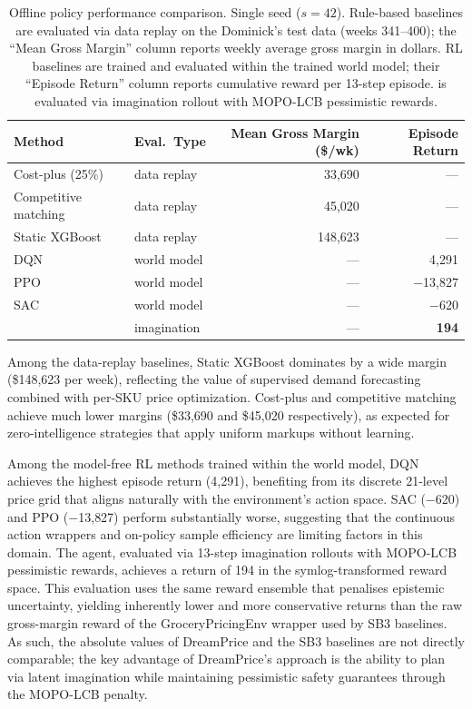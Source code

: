 \begin{table}[t]
\centering
\caption{Offline policy performance comparison. Single seed ($s=42$). Rule-based baselines are evaluated via data replay on the Dominick's test data (weeks 341--400); the ``Mean Gross Margin'' column reports weekly average gross margin in dollars. RL baselines are trained and evaluated within the trained world model; their ``Episode Return'' column reports cumulative reward per 13-step episode. \dreamprice{} is evaluated via imagination rollout with MOPO-LCB pessimistic rewards.\vspace{2pt}}
\label{tab:baseline-comparison}
\small
\begin{tabular}{@{}llrr@{}}
\toprule
\textbf{Method} & \textbf{Eval.\ Type} & \textbf{Mean Gross Margin (\$/wk)} & \textbf{Episode Return} \\
\midrule
Cost-plus (25\%) & data replay & 33{,}690 & --- \\
Competitive matching & data replay & 45{,}020 & --- \\
Static XGBoost & data replay & 148{,}623 & --- \\
\midrule
DQN & world model & --- & 4{,}291 \\
PPO & world model & --- & $-$13{,}827 \\
SAC & world model & --- & $-$620 \\
\midrule
\dreamprice{} & imagination & --- & \textbf{194} \\
\bottomrule
\end{tabular}
\end{table}

Among the data-replay baselines, Static XGBoost dominates by a wide margin (\$148{,}623 per week), reflecting the value of supervised demand forecasting combined with per-SKU price optimization. Cost-plus and competitive matching achieve much lower margins (\$33{,}690 and \$45{,}020 respectively), as expected for zero-intelligence strategies that apply uniform markups without learning.

Among the model-free RL methods trained within the world model, DQN achieves the highest episode return (4{,}291), benefiting from its discrete 21-level price grid that aligns naturally with the environment's action space. SAC ($-$620) and PPO ($-$13{,}827) perform substantially worse, suggesting that the continuous action wrappers and on-policy sample efficiency are limiting factors in this domain. The \dreamprice{} agent, evaluated via 13-step imagination rollouts with MOPO-LCB pessimistic rewards, achieves a return of 194 in the symlog-transformed reward space. This evaluation uses the same reward ensemble that penalises epistemic uncertainty, yielding inherently lower and more conservative returns than the raw gross-margin reward of the GroceryPricingEnv wrapper used by SB3 baselines. As such, the absolute values of DreamPrice and the SB3 baselines are not directly comparable; the key advantage of DreamPrice's approach is the ability to plan via latent imagination while maintaining pessimistic safety guarantees through the MOPO-LCB penalty.

